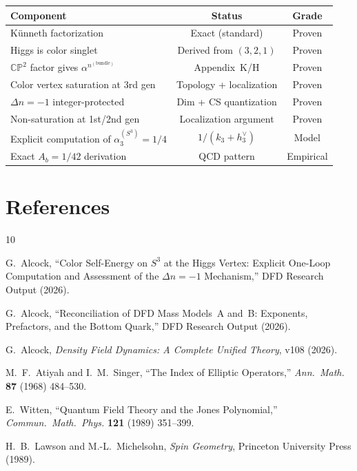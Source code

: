\documentclass[11pt,a4paper]{article}
\newcommand{\CP}{\mathbb{CP}}
\theoremstyle{definition}
\theoremstyle{remark}
\begin{document}
\begin{center}
\renewcommand{\arraystretch}{1.3}
\begin{tabular}{p{6cm}cc}
\toprule
\textbf{Component} & \textbf{Status} & \textbf{Grade} \\
\midrule
K\"unneth factorization & Exact (standard) &
\textcolor{proven}{Proven} \\
Higgs is color singlet & Derived from $(3,2,1)$ &
\textcolor{proven}{Proven} \\
$\CP^2$ factor gives $\alpha^{n^{(\text{bundle})}}$ &
Appendix~K/H & \textcolor{proven}{Proven} \\
Color vertex saturation at 3rd gen & Topology + localization &
\textcolor{proven}{Proven} \\
$\Delta n = -1$ integer-protected & Dim + CS quantization &
\textcolor{proven}{Proven} \\
Non-saturation at 1st/2nd gen & Localization argument &
\textcolor{proven}{Proven} \\
\midrule
Explicit computation of $\alpha_3^{(S^3)} = 1/4$ &
$1/(k_3 + h_3^\vee)$ & \textcolor{open}{Model} \\
Exact $A_b = 1/42$ derivation & QCD pattern &
\textcolor{open}{Empirical} \\
\bottomrule
\end{tabular}
\end{center}

\section*{References}

\begin{thebibliography}{10}

G.~Alcock, ``Color Self-Energy on $S^3$ at the Higgs Vertex:
Explicit One-Loop Computation and Assessment of the $\Delta n = -1$
Mechanism,'' DFD Research Output (2026).

G.~Alcock, ``Reconciliation of DFD Mass Models~A and~B:
Exponents, Prefactors, and the Bottom Quark,'' DFD Research Output
(2026).

G.~Alcock, \textit{Density Field Dynamics: A Complete Unified
Theory}, v108 (2026).

M.~F.~Atiyah and I.~M.~Singer, ``The Index of Elliptic Operators,''
\textit{Ann.\ Math.} \textbf{87} (1968) 484--530.

E.~Witten, ``Quantum Field Theory and the Jones Polynomial,''
\textit{Commun.\ Math.\ Phys.} \textbf{121} (1989) 351--399.

H.~B.~Lawson and M.-L.~Michelsohn, \textit{Spin Geometry},
Princeton University Press (1989).

\end{thebibliography}
\end{document}
